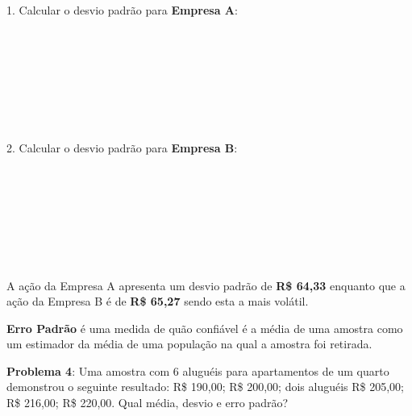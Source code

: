 1. Calcular o desvio padrão para \textbf{Empresa A}: \\
 \keystroke{$\sum$} \\
    \keystroke{$\sum+$} \\
    \keystroke{$\sum+$} \\ 
    \keystroke{$\sum+$} \\
    \keystroke{$\sum+$} \\ 
    \keystroke{$\sum+$} \\ 
    \keystroke{$\sum+$} \\ 
 

2. Calcular o desvio padrão para \textbf{Empresa B}: \\
 \keystroke{$\sum$} \\
    \keystroke{$\sum+$} \\ 
    \keystroke{$\sum+$} \\
    \keystroke{$\sum+$} \\
    \keystroke{$\sum+$} \\
    \keystroke{$\sum+$} \\
    \keystroke{$\sum+$} \\
 

A ação da Empresa A apresenta um desvio padrão de \textbf{R\$ 64,33} enquanto que a ação da Empresa B é de \textbf{R\$ 65,27} sendo esta a mais volátil.

\textbf{Erro Padrão} é uma medida de quão confiável é a média de uma amostra como um estimador da média de uma população na qual a amostra foi retirada.

\textbf{Problema 4}: Uma amostra com 6 aluguéis para apartamentos de um quarto demonstrou o seguinte resultado: R\$ 190,00; R\$ 200,00; dois aluguéis R\$ 205,00; R\$ 216,00; R\$ 220,00. Qual média, desvio e erro padrão?

